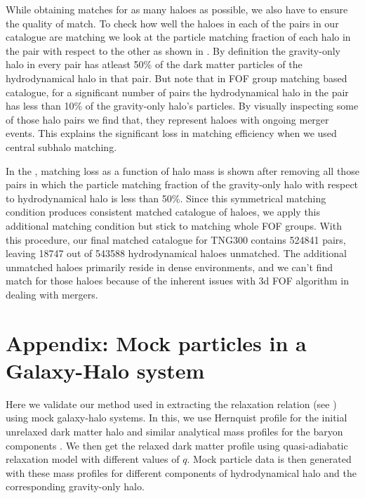 While obtaining matches for as many haloes as possible, we also have to ensure the quality of match. To check how well the haloes in each of the pairs in our catalogue are matching we look at the particle matching fraction of each halo in the pair with respect to the other as shown in . By definition the gravity-only halo in every pair has atleast 50\% of the dark matter particles of the hydrodynamical halo in that pair. But note that in FOF group matching based catalogue, for a significant number of pairs the hydrodynamical halo in the pair has less than 10\% of the gravity-only halo's particles. By visually inspecting some of those halo pairs we find that, they represent haloes with ongoing merger events. This explains the significant loss in matching efficiency when we used central subhalo matching. 

In the , matching loss as a function of halo mass is shown after removing all those pairs in which the particle matching fraction of the gravity-only halo with respect to hydrodynamical halo is less than 50\%. Since this symmetrical matching condition produces consistent matched catalogue of haloes, we apply this additional matching condition  but stick to matching whole FOF groups. With this procedure, our final matched catalogue for TNG300 contains 524841 pairs, leaving 18747 out of 543588 hydrodynamical haloes unmatched. The additional unmatched haloes primarily reside in dense environments, and we can't find match for those haloes because of the inherent issues with 3d FOF algorithm in dealing with mergers. 


\section{Appendix: Mock particles in a Galaxy-Halo system}
\label{appen:Mock-ch:sims}
Here we validate our method used in extracting the relaxation relation (see ) using mock galaxy-halo systems.
In this, we use Hernquist profile for the initial unrelaxed dark matter halo and similar analytical mass profiles for the baryon components \citep[see appendix of][]{2021MNRAS.507..632P}. We then get the relaxed dark matter profile using quasi-adiabatic relaxation model with different values of $q$. Mock particle data is then generated with these mass profiles for different components of hydrodynamical halo and the corresponding gravity-only halo.

